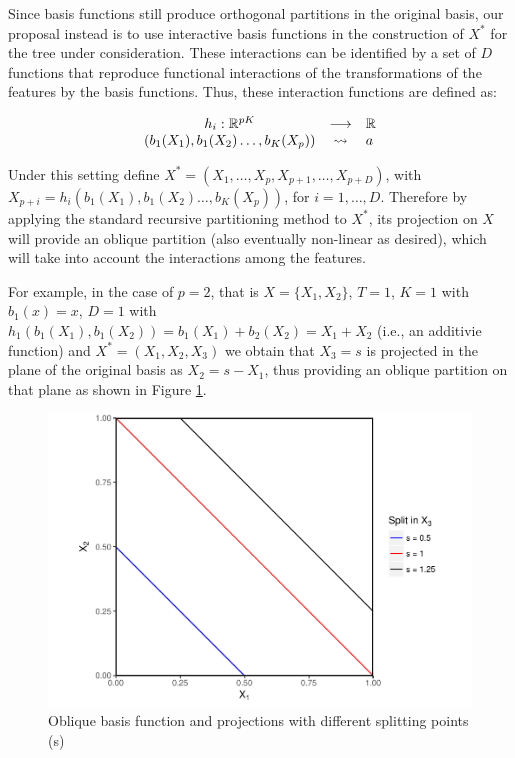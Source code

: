 \documentclass[]{elsarticle} %
\makeatletter
\def\maxwidth{\ifdim\Gin@nat@width>\linewidth\linewidth
\else\Gin@nat@width\fi}
\let\Oldincludegraphics\includegraphics
\renewcommand{\includegraphics}[1]{\Oldincludegraphics[width=\maxwidth]{#1}}
\makeatother
\begin{document}
Since basis functions still produce orthogonal partitions in the
original basis, our proposal instead is to use interactive basis
functions in the construction of \(X^\ast\) for the tree under
consideration. These interactions can be identified by a set of \(D\)
functions that reproduce functional interactions of the transformations
of the features by the basis functions. Thus, these interaction
functions are defined as:

\[
\begin{array}{ccl}h_{i}:\mathbb{R}^{pK}&\longrightarrow&\mathbb{R}\\{\tiny (b_1(X_1),b_1(X_2)\dots, b_K(X_p))}&\leadsto &a\end{array}
\]

Under this setting define
\(X^{\ast }=\left( X_{1},\dots,X_{p},X_{p+1},\dots ,X_{p+D} \right)\),
with \(X_{p+i}=h_i(b_1(X_1),b_1(X_2)\dots, b_K(X_p))\), for
\(i=1,\dots ,D\). Therefore by applying the standard recursive
partitioning method to \(X^\ast\), its projection on \(X\) will provide
an oblique partition (also eventually non-linear as desired), which will
take into account the interactions among the features.

For example, in the case of \(p=2\), that is \(X=\{X_1,X_2\}\), \(T=1\),
\(K=1\) with \(b_1(x)=x\), \(D=1\) with
\(h_1(b_1(X_1),b_1(X_2))=b_1(X_1)+b_2(X_2)=X_1+X_2\) (i.e., an additivie
function) and \(X^{\ast }=\left( X_{1},X_{2},X_{3} \right)\) we obtain
that \(X_3=s\) is projected in the plane of the original basis as
\(X_2=s-X_1\), thus providing an oblique partition on that plane as
shown in Figure \ref{fig:fig4-additive-basis}.

\begin{figure}[htbp]
\centering
\includegraphics{Trees_with_Base_Functions_files/figure-latex/fig4-additive-basis-1.pdf}
\caption{\label{fig:fig4-additive-basis}Oblique basis function and
projections with different splitting points (s)}
\end{figure}
\end{document}
